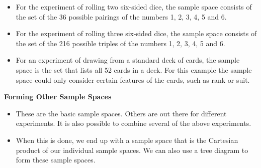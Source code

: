 \documentclass[IntroMain.tex]{subfiles}
\begin{document}
\begin{frame}
	\begin{itemize}
		\item For the experiment of rolling two six-sided dice, the sample space consists of the set of the 36 possible pairings of the numbers 1, 2, 3, 4, 5 and 6.
		\item For the experiment of rolling three six-sided dice, the sample space consists of the set of the 216 possible triples of the numbers 1, 2, 3, 4, 5 and 6.
		\item For an experiment of drawing from a standard deck of cards, the sample space is the set that lists all 52 cards in a deck. For this example the sample space could only consider certain features of the cards, such as rank or suit.
	\end{itemize}
\end{frame}
\begin{frame}
	\textbf{Forming Other Sample Spaces}
	
	\begin{itemize}
	\item These are the basic sample spaces. Others are out there for different experiments. It is also possible to combine several of the above experiments. 
	\item When this is done, we end up with a sample space that is the Cartesian product of our individual sample spaces. We can also use a tree diagram to form these sample spaces.
	\end{itemize}

	
\end{frame}
\end{document}
